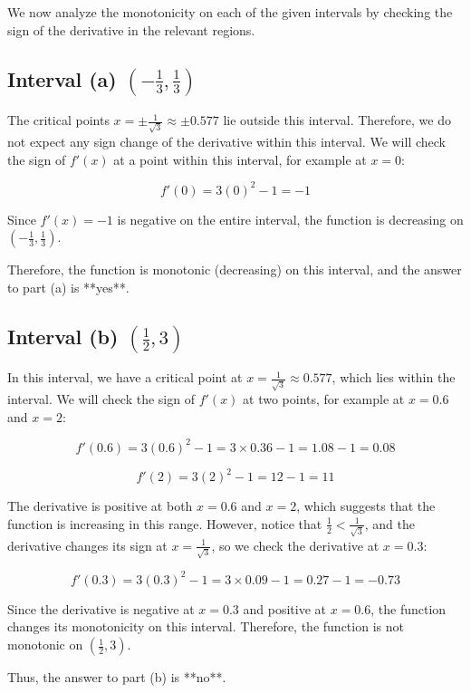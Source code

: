 \documentclass{article}
\begin{document}
We now analyze the monotonicity on each of the given intervals by checking the sign of the derivative in the relevant regions.

\subsection{Interval (a) \( \left( -\frac{1}{3}, \frac{1}{3} \right) \)}

The critical points \( x = \pm \frac{1}{\sqrt{3}} \approx \pm 0.577 \) lie outside this interval. Therefore, we do not expect any sign change of the derivative within this interval. We will check the sign of \( f'(x) \) at a point within this interval, for example at \( x = 0 \):

\[
f'(0) = 3(0)^2 - 1 = -1
\]

Since \( f'(x) = -1 \) is negative on the entire interval, the function is decreasing on \( \left( -\frac{1}{3}, \frac{1}{3} \right) \).

Therefore, the function is monotonic (decreasing) on this interval, and the answer to part (a) is **yes**.

\subsection{Interval (b) \( \left( \frac{1}{2}, 3 \right) \)}

In this interval, we have a critical point at \( x = \frac{1}{\sqrt{3}} \approx 0.577 \), which lies within the interval. We will check the sign of \( f'(x) \) at two points, for example at \( x = 0.6 \) and \( x = 2 \):

\[
f'(0.6) = 3(0.6)^2 - 1 = 3 \times 0.36 - 1 = 1.08 - 1 = 0.08
\]

\[
f'(2) = 3(2)^2 - 1 = 12 - 1 = 11
\]

The derivative is positive at both \( x = 0.6 \) and \( x = 2 \), which suggests that the function is increasing in this range. However, notice that \( \frac{1}{2} < \frac{1}{\sqrt{3}} \), and the derivative changes its sign at \( x = \frac{1}{\sqrt{3}} \), so we check the derivative at \( x = 0.3 \):

\[
f'(0.3) = 3(0.3)^2 - 1 = 3 \times 0.09 - 1 = 0.27 - 1 = -0.73
\]

Since the derivative is negative at \( x = 0.3 \) and positive at \( x = 0.6 \), the function changes its monotonicity on this interval. Therefore, the function is not monotonic on \( \left( \frac{1}{2}, 3 \right) \).

Thus, the answer to part (b) is **no**.
\end{document}
